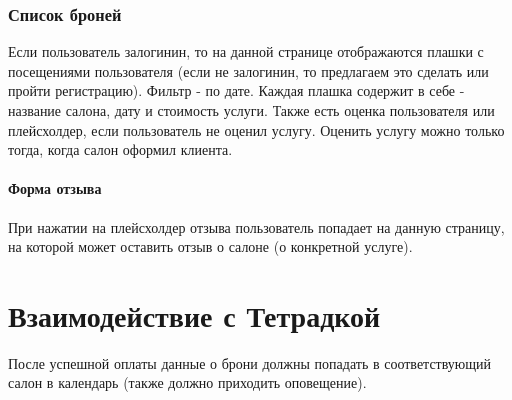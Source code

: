 \documentclass[DIV=calc, paper=a4, fontsize=11pt]{scrartcl} %
\begin{document}
\subsubsection{Список броней}
Если пользователь залогинин, то на данной странице отображаются плашки с посещениями пользователя (если не залогинин, то предлагаем это сделать или пройти регистрацию). Фильтр - по дате.
Каждая плашка содержит в себе - название салона, дату и стоимость услуги. Также есть оценка пользователя или плейсхолдер, если пользователь не оценил услугу. Оценить услугу можно только тогда, когда салон оформил клиента.

\paragraph{Форма отзыва}
При нажатии на плейсхолдер отзыва пользователь попадает на данную страницу, на которой может оставить отзыв о салоне (о конкретной услуге).



\section{Взаимодействие с Тетрадкой}
После успешной оплаты данные о брони должны попадать в соответствующий салон в календарь (также должно приходить оповещение).
\end{document}
